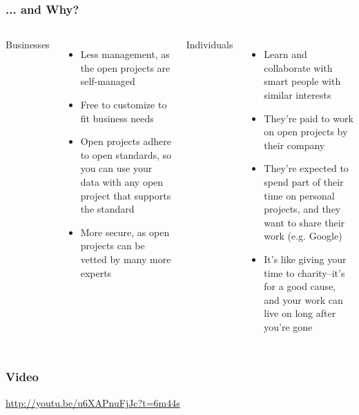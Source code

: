 \documentclass{beamer}
\begin{document}
\begin{frame}
  \frametitle{... and Why?}
  \begin{columns}[t]
    \begin{Large}Businesses \end{Large}
    \begin{itemize}
    \item Less management, as the open projects are self-managed
    \item Free to customize to fit business needs
    \item Open projects adhere to open standards, so you can use your data with any open project that supports the standard
    \item More secure, as open projects can be vetted by many more experts
    \end{itemize}
    \begin{Large}Individuals\end{Large}
    \begin{itemize}
    \item Learn and collaborate with smart people with similar interests
    \item They're paid to work on open projects by their company
    \item They're expected to spend part of their time on personal projects, and they want to share their work (e.g. Google)
    \item It's like giving your time to charity--it's for a good cause, and your work can live on long after you're gone
    \end{itemize}
  \end{columns}
\end{frame}

\begin{frame}
  \frametitle{Video}
  \begin{center}
    \begin{LARGE}
      \href{http://youtu.be/u6XAPnuFjJc?t=6m44s}{http://youtu.be/u6XAPnuFjJc?t=6m44s}
    \end{LARGE}
  \end{center}

\end{frame}
\end{document}
